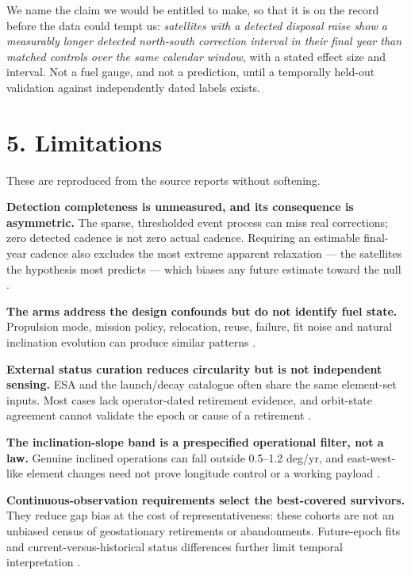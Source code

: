 \documentclass[11pt]{article}
\begin{document}
We name the claim we would be entitled to make, so that it is on the record before the data could tempt us: \emph{satellites with a detected disposal raise show a measurably longer detected north-south correction interval in their final year than matched controls over the same calendar window}, with a stated effect size and interval. Not a fuel gauge, and not a prediction, until a temporally held-out validation against independently dated labels exists.

\section*{5. Limitations}

These are reproduced from the source reports without softening.

\textbf{Detection completeness is unmeasured, and its consequence is asymmetric.} The sparse, thresholded event process can miss real corrections; zero detected cadence is not zero actual cadence. Requiring an estimable final-year cadence also excludes the most extreme apparent relaxation --- the satellites the hypothesis most predicts --- which biases any future estimate toward the null%
.

\textbf{The arms address the design confounds but do not identify fuel state.} Propulsion mode, mission policy, relocation, reuse, failure, fit noise and natural inclination evolution can produce similar patterns%
.

\textbf{External status curation reduces circularity but is not independent sensing.} ESA and the launch/decay catalogue often share the same element-set inputs. Most cases lack operator-dated retirement evidence, and orbit-state agreement cannot validate the epoch or cause of a retirement%
.

\textbf{The inclination-slope band is a prespecified operational filter, not a law.} Genuine inclined operations can fall outside 0.5--1.2 deg/yr, and east-west-like element changes need not prove longitude control or a working payload%
.

\textbf{Continuous-observation requirements select the best-covered survivors.} They reduce gap bias at the cost of representativeness: these cohorts are not an unbiased census of geostationary retirements or abandonments. Future-epoch fits and current-versus-historical status differences further limit temporal interpretation%
.
\end{document}
